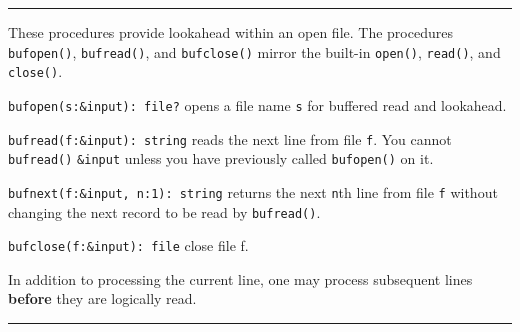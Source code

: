 
\vspace{0.25cm}\hrule{}

These procedures provide lookahead within an open file. The procedures
\texttt{bufopen()}, \texttt{bufread()}, and \texttt{bufclose()} mirror
the built-in \texttt{open()}, \texttt{read()}, and \texttt{close()}.

\texttt{bufopen(s:\&input): file?} opens a file name \texttt{s} for
buffered read and lookahead.

\texttt{bufread(f:\&input): string} reads the next line from file
\texttt{f}. You cannot \texttt{bufread()} \texttt{\&input} unless you
have previously called \texttt{bufopen()} on it.

\texttt{bufnext(f:\&input, n:1): string} returns the next \texttt{n}th
line from file \texttt{f} without changing the next record to be read
by \texttt{bufread()}.

\texttt{bufclose(f:\&input): file} close file f.

In addition to processing the current line, one may process subsequent
lines \textbf{before} they are logically read. %



\vspace{0.25cm}\hrule{}

